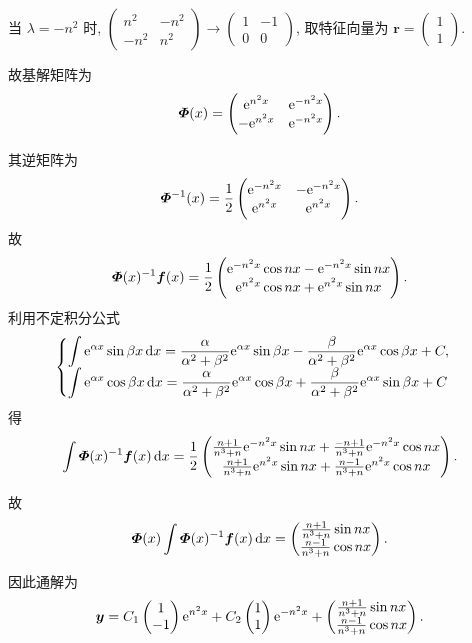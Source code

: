\begin{solve}
  当 $\lambda=-n^2$ 时, $\begin{pmatrix}n^2&-n^2\\-n^2&n^2\end{pmatrix}\to\begin{pmatrix}1&-1\\0&0\end{pmatrix}$,
  取特征向量为 $\bm{r}=\begin{pmatrix}1\\1\end{pmatrix}$.

  故基解矩阵为
  \[\bm{\varPhi}(x)=\begin{pmatrix}\mathrm{e}^{n^2x}&\mathrm{e}^{-n^2x}\\-\mathrm{e}^{n^2x}&\mathrm{e}^{-n^2x}\end{pmatrix}.\]

  其逆矩阵为
  \[\bm{\varPhi}^{-1}(x)
    = \frac{1}{2}\begin{pmatrix}\mathrm{e}^{-n^2x}&-\mathrm{e}^{-n^2x}\\\mathrm{e}^{n^2x}&\mathrm{e}^{n^2x}\end{pmatrix}.\]
  故
  \[\bm{\varPhi}(x)^{-1}\bm{f}(x)
    = \frac{1}{2}\begin{pmatrix}\mathrm{e}^{-n^2x}\cos nx-\mathrm{e}^{-n^2x}\sin nx\\\mathrm{e}^{n^2x}\cos nx+\mathrm{e}^{n^2x}\sin nx\end{pmatrix}.\]
  利用不定积分公式
  \[\begin{cases}\displaystyle
  \int\mathrm{e}^{\alpha x}\sin\beta x\mathop{}\!\mathrm{d} x=\frac{\alpha}{\alpha^2+\beta^2}\mathrm{e}^{\alpha x}\sin\beta x-\frac{\beta}{\alpha^2+\beta^2}\mathrm{e}^{\alpha x}\cos\beta x+C, \\
  \displaystyle\int\mathrm{e}^{\alpha x}\cos\beta x\mathop{}\!\mathrm{d} x=\frac{\alpha}{\alpha^2+\beta^2}\mathrm{e}^{\alpha x}\cos\beta x+\frac{\beta}{\alpha^2+\beta^2}\mathrm{e}^{\alpha x}\sin\beta x+C
  \end{cases}\]
  得
  \[\int\bm{\varPhi}(x)^{-1}\bm{f}(x)\mathop{}\!\mathrm{d} x=\frac{1}{2}\begin{pmatrix}\frac{n+1}{n^3+n}\mathrm{e}^{-n^2x}\sin nx+\frac{-n+1}{n^3+n}\mathrm{e}^{-n^2x}\cos nx\\
  \frac{n+1}{n^3+n}\mathrm{e}^{n^2x}\sin nx+\frac{n-1}{n^3+n}\mathrm{e}^{n^2x}\cos nx
  \end{pmatrix}.\]

  故
  \[\bm{\varPhi}(x)\int\bm{\varPhi}(x)^{-1}\bm{f}(x)\mathop{}\!\mathrm{d} x
    =\begin{pmatrix}
      \frac{n+1}{n^3+n}\sin nx \\
      \frac{n-1}{n^3+n}\cos nx
     \end{pmatrix}.\]

  因此通解为
  \[\bm{y} = C_1\begin{pmatrix}1\\-1\end{pmatrix}\mathrm{e}^{n^2x}
    + C_2\begin{pmatrix}1\\1\end{pmatrix}\mathrm{e}^{-n^2x}
    + \begin{pmatrix}
        \frac{n+1}{n^3+n}\sin nx\\
        \frac{n-1}{n^3+n}\cos nx
      \end{pmatrix}.\]


\end{solve}
